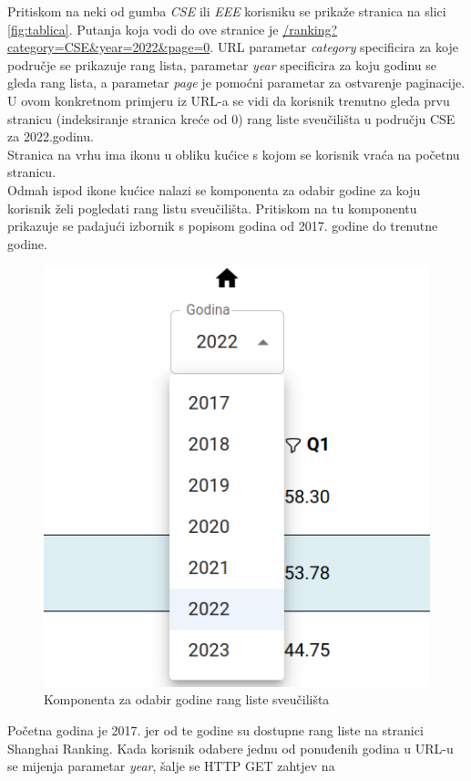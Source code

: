 \documentclass[times, utf8, zavrsni]{fer}
\begin{document}
Pritiskom na neki od gumba \emph{CSE} ili \emph{EEE} korisniku se prikaže stranica na slici \ref{fig:tablica}. Putanja koja vodi do ove stranice 
je \url{/ranking?category=CSE\&year=2022\&page=0}.
URL parametar \emph{category} specificira za koje područje se prikazuje rang lista, parametar \emph{year} specificira
za koju godinu se gleda rang lista, a parametar \emph{page} je pomoćni parametar za ostvarenje paginacije.  
U ovom konkretnom primjeru iz URL-a se vidi da korisnik trenutno gleda prvu stranicu (indeksiranje stranica kreće od 0) rang liste sveučilišta u području CSE za 2022.godinu.
\\Stranica na vrhu ima ikonu u obliku kućice s kojom se korisnik vraća na početnu stranicu. \\Odmah ispod ikone kućice nalazi se komponenta
za odabir godine za koju korisnik želi pogledati rang listu sveučilišta. Pritiskom na tu komponentu prikazuje se padajući izbornik 
s popisom godina od 2017. godine do trenutne godine. 
\begin{figure}[htb]
    \centering
       \includegraphics[scale=0.24]{select.png} 
       \caption{Komponenta za odabir godine rang liste sveučilišta}
       \label{fig:select}
       \end{figure}
Početna godina je 2017. jer od te godine su dostupne rang liste na stranici 
Shanghai Ranking. Kada korisnik odabere jednu od ponuđenih godina u URL-u se mijenja parametar \emph{year}, šalje se HTTP GET zahtjev na
\end{document}
